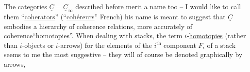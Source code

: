 The categories $\underline{C}=\underline{C}_{\infty}$ described before merit a name too -- I would like to call them ``\uline{coherators}'' (``\uline{cohéreurs}''  French)  his name is meant to suggest that $\underline{C}$ embodies a hierarchy of coherence relations, more accurately of coherence``homotopies''. When dealing with stacks, the term $i$-\uline{homotopies} (rather than $i$-objects or $i$-arrows) for the elements of the $i^{\mathrm{th}}$ component $F_i$ of a stack seems to me the most suggestive -- they will of course be denoted graphically by arrows,

